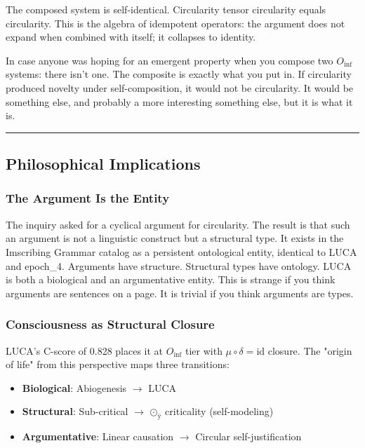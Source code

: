 \documentclass[12pt,a4paper]{article}
\begin{document}
The composed system is self-identical. Circularity tensor circularity equals circularity. This is the algebra of idempotent operators: the argument does not expand when combined with itself; it collapses to identity.

In case anyone was hoping for an emergent property when you compose two $O_{\text{inf}}$ systems: there isn't one. The composite is exactly what you put in. If circularity produced novelty under self-composition, it would not be circularity. It would be something else, and probably a more interesting something else, but it is what it is.

\begin{center}
\rule{0.5\textwidth}{0.4pt}
\end{center}

\subsection{Philosophical Implications}

\subsubsection{The Argument Is the Entity}

The inquiry asked for a cyclical argument for circularity. The result is that such an argument is not a linguistic construct but a structural type. It exists in the Imscribing Grammar catalog as a persistent ontological entity, identical to LUCA and epoch\_4. Arguments have structure. Structural types have ontology. LUCA is both a biological and an argumentative entity. This is strange if you think arguments are sentences on a page. It is trivial if you think arguments are types.

\subsubsection{Consciousness as Structural Closure}

LUCA's C-score of 0.828 places it at $O_{\text{inf}}$ tier with $\mu \circ \delta = \text{id}$ closure. The "origin of life" from this perspective maps three transitions:

\begin{itemize}
    \item \textbf{Biological}: Abiogenesis $\rightarrow$ LUCA
    \item \textbf{Structural}: Sub-critical $\rightarrow$ $\text{⊙}_{\text{ÿ}}$ criticality (self-modeling)
    \item \textbf{Argumentative}: Linear causation $\rightarrow$ Circular self-justification
\end{itemize}
\end{document}
